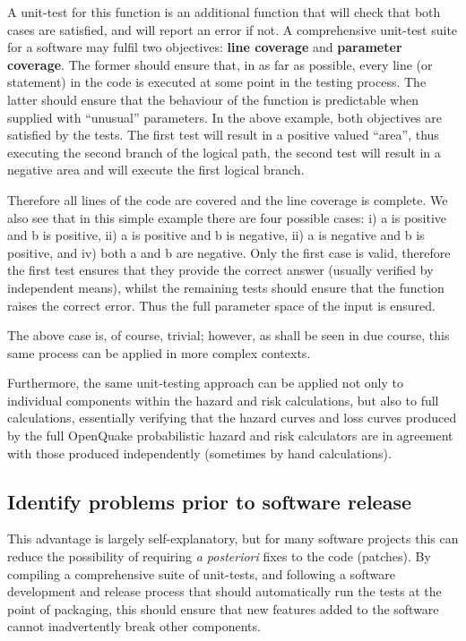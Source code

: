 A unit-test for this function is an additional function that will check that both cases are satisfied, and will report an error if not. 
A comprehensive unit-test suite for a software may fulfil two objectives: \textbf{line coverage} and \textbf{parameter coverage}. The former should ensure that, in as far as possible, every line (or statement) in the code is executed at some point in the testing process. The latter should ensure that the behaviour of the function is predictable when supplied with ``unusual'' parameters. In the above example, both objectives are satisfied by the tests. The first test will result in a positive valued ``area'', thus executing the second branch of the logical path, the second test will result in a negative area and will execute the first logical branch. %

Therefore all lines of the code are covered and the line coverage is complete. We also see that in this simple example there are four possible
cases: i) a is positive and b is positive, ii) a is positive and b is negative,  ii) a is negative and b is positive, and iv) both a and b are negative. Only the first case is valid, therefore the first test ensures that they provide the correct answer (usually verified by independent means), whilst the remaining tests should ensure that the function raises the correct error. Thus the full parameter space of the input is ensured.

The above case is, of course, trivial; however, as shall be seen in due
course, this same process can be applied in more complex contexts.

Furthermore, the same unit-testing approach can be applied not only to individual components within the hazard and risk calculations, but also to full calculations, essentially verifying that the hazard curves and loss curves produced by the full OpenQuake probabilistic hazard and risk calculators are in agreement with those produced independently (sometimes by hand calculations).


\subsection{Identify problems prior to software release}
This advantage is largely self-explanatory, but for many software projects this can reduce the possibility of requiring \emph{a posteriori} fixes to the code (patches). By compiling a comprehensive suite of unit-tests, and following a software development and release process that should automatically run the tests at the point of packaging, this should ensure that new features added to the software cannot inadvertently break other components.


